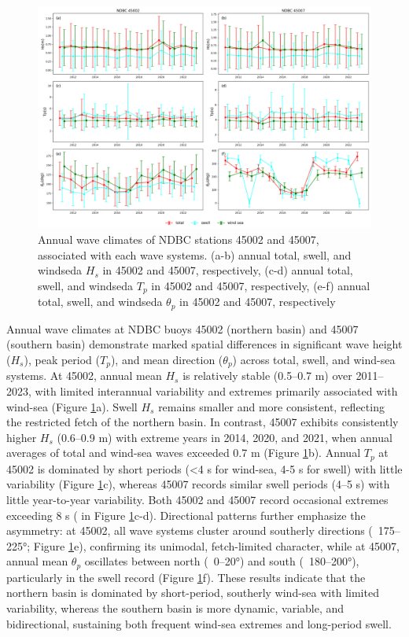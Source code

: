 \begin{figure}[htbp]
  \centering
  \includegraphics[width=1\textwidth]{chapter4/resources/ndbc_annual.png}
  \caption{Annual wave climates of NDBC stations 45002 and 45007, associated
  with each wave systems. (a-b) annual total, swell, and windseda $H_s$ in 45002
  and 45007, respectively, (c-d) annual total, swell, and windseda $T_p$ in
  45002 and 45007, respectively, (e-f) annual total, swell, and windseda
  $\theta_p$ in 45002 and 45007, respectively }
  \label{fig:ndbc_annual}
\end{figure}

Annual wave climates at NDBC buoys 45002 (northern basin) and 45007 (southern
basin) demonstrate marked spatial differences in significant wave height
($H_s$), peak period ($T_p$), and mean direction ($\theta_p$) across total,
swell, and wind-sea systems. At 45002, annual mean $H_s$ is relatively stable
(0.5–0.7 m) over 2011–2023, with limited interannual variability and extremes
primarily associated with wind-sea (Figure \ref{fig:ndbc_annual}a). Swell $H_s$
remains smaller and more consistent, reflecting the restricted fetch of the
northern basin. In contrast, 45007 exhibits consistently higher $H_s$ (0.6–0.9
m) with extreme years in 2014, 2020, and 2021, when annual averages of total and
wind-sea waves exceeded 0.7 m (Figure \ref{fig:ndbc_annual}b). Annual $T_p$ at
45002 is dominated by short periods (<4 s for wind-sea, 4-5 s for swell) with
little variability (Figure \ref{fig:ndbc_annual}c), whereas 45007 records
similar swell periods (4–5 s) with  little year-to-year variability. Both 45002
and 45007 record occasional extremes exceeding 8 s ( in Figure
\ref{fig:ndbc_annual}c-d). Directional patterns further emphasize the asymmetry:
at 45002, all wave systems cluster around southerly directions (~175–225°;
Figure \ref{fig:ndbc_annual}e), confirming its unimodal, fetch-limited
character, while at 45007, annual mean $\theta_p$ oscillates between north
(~0–20°) and south (~180–200°), particularly in the swell record (Figure
\ref{fig:ndbc_annual}f). These results indicate that the northern basin is
dominated by short-period, southerly wind-sea with limited variability, whereas
the southern basin is more dynamic, variable, and bidirectional, sustaining both
frequent wind-sea extremes and long-period swell.

